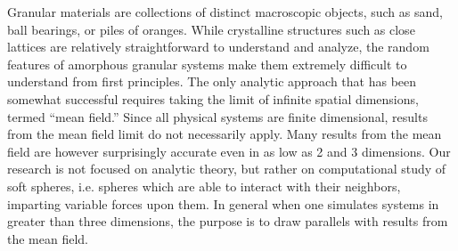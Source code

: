 Granular materials are collections of distinct macroscopic objects, such as sand, ball bearings, or piles of oranges. While crystalline structures such as close lattices are relatively straightforward to understand and analyze, the random features of amorphous granular systems make them extremely difficult to understand from first principles. The only analytic approach that has been somewhat successful requires taking the limit of infinite spatial dimensions, termed ``mean field.'' Since all physical systems are finite dimensional, results from the mean field limit do not necessarily apply. Many results from the mean field are however surprisingly accurate even in as low as 2 and 3 dimensions. Our research is not focused on analytic theory, but rather on computational study of soft spheres, i.e. spheres which are able to interact with their neighbors, imparting variable forces upon them. %
In general when one simulates systems in greater than three dimensions, the purpose is to draw parallels with results from the mean field.


